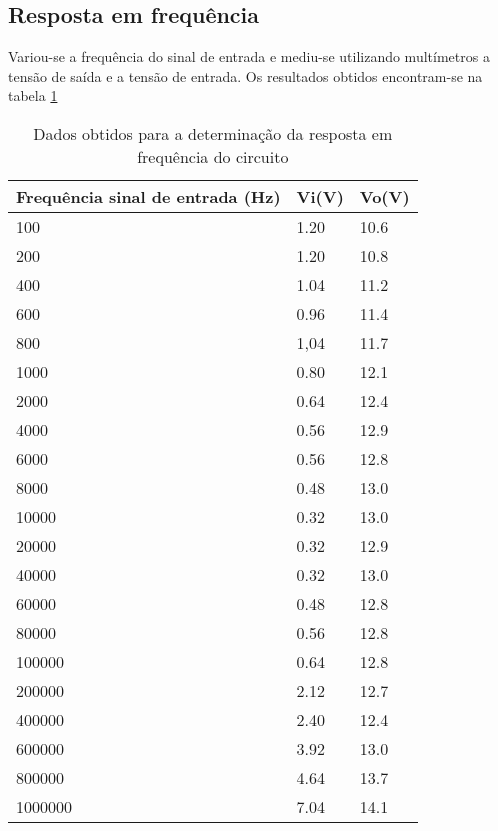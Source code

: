 \documentclass[%
  reprint,
  nofootinbib,
  amsmath,amssymb,
  aps,
  10pt,
  a4paper
]{revtex4-1}
\begin{document}
\subsection{Resposta em frequência}
Variou-se a frequência do sinal de entrada e mediu-se utilizando multímetros a tensão de saída e a tensão de entrada. Os resultados obtidos encontram-se na tabela \ref{tab:respostafrequenciaresultados}
\begin{table}[h]
    \begin{tabular}{|l|l|l|}
    \hline
    Frequência sinal de entrada (Hz) & Vi(V) & Vo(V) \\ \hline
    100                              & 1.20  & 10.6  \\ \hline
    200                              & 1.20  & 10.8  \\ \hline
    400                              & 1.04  & 11.2  \\ \hline
    600                              & 0.96  & 11.4  \\ \hline
    800                              & 1,04  & 11.7  \\ \hline
    1000                             & 0.80  & 12.1  \\ \hline
    2000                             & 0.64  & 12.4  \\ \hline
    4000                             & 0.56  & 12.9  \\ \hline
    6000                             & 0.56  & 12.8  \\ \hline
    8000                             & 0.48  & 13.0  \\ \hline
    10000                            & 0.32  & 13.0  \\ \hline
    20000                            & 0.32  & 12.9  \\ \hline
    40000                            & 0.32  & 13.0  \\ \hline
    60000                            & 0.48  & 12.8  \\ \hline
    80000                            & 0.56  & 12.8  \\ \hline
    100000                           & 0.64  & 12.8  \\ \hline
    200000                           & 2.12  & 12.7  \\ \hline
    400000                           & 2.40  & 12.4  \\ \hline
    600000                           & 3.92  & 13.0  \\ \hline
    800000                           & 4.64  & 13.7  \\ \hline
    1000000                          & 7.04  & 14.1  \\ \hline
    \end{tabular}
\caption{Dados obtidos para a determinação da resposta em frequência do circuito}
\label{tab:respostafrequenciaresultados}
\end{table}
\end{document}
